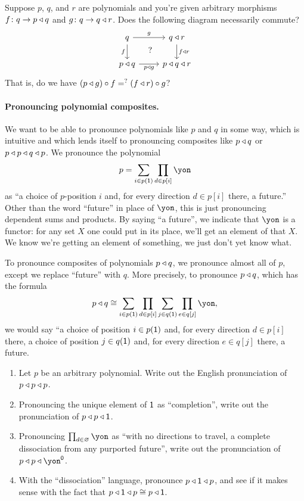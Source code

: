 \documentclass[Book-Poly]{subfiles}
\begin{document}
\begin{exercise}
Suppose $p$, $q$, and $r$ are polynomials and you're given arbitrary morphisms $f\colon q\to p\mathbin{\triangleleft} q$ and $g\colon q\to q\mathbin{\triangleleft} r$. Does the following diagram necessarily commute?
\[
\begin{tikzcd}
	q\ar[r, "g"]\ar[d, "f"']&
	q\tri r\ar[d, "f\tri r"]\\
	p\tri q\ar[r, "p\tri g"']&
	p\tri q\tri r\ar[ul, phantom, "?"]
\end{tikzcd}
\]
That is, do we have $(p\mathbin{\triangleleft} g)\circ f=^?(f\mathbin{\triangleleft} r)\circ g$?
\end{exercise}

\paragraph{Pronouncing polynomial composites.}

We want to be able to pronounce polynomials like $p$ and $q$ in some way, which is intuitive and which lends itself to pronouncing composites like $p\mathbin{\triangleleft} q$ or $p\mathbin{\triangleleft} p\mathbin{\triangleleft} q\mathbin{\triangleleft} p$. We pronounce the polynomial
\[p=\sum_{i\in p(\1)}\prod_{d\in p[i]}\yon\]
as ``a choice of $p$-position $i$ and, for every direction $d\in p[i]$ there, a future.'' Other than the word ``future'' in place of $\yon$, this is just pronouncing dependent sums and products. By saying ``a future'', we indicate that $\yon$ is a functor: for any set $X$ one could put in its place, we'll get an element of that $X$. We know we're getting an element of something, we just don't yet know what.

To pronounce composites of polynomials $p\mathbin{\triangleleft} q$, we pronounce almost all of $p$, except we replace ``future'' with $q$. More precisely, to pronounce $p\mathbin{\triangleleft} q$, which has the formula
\[p\tri q\cong\sum_{i\in p(\1)}\prod_{d\in p[i]}\sum_{j\in q(\1)}\prod_{e\in q[j]}\yon,
\]
we would say ``a choice of position $i\in p(\textsf{1})$ and, for every direction $d\in p[i]$ there, a choice of position $j\in q(\textsf{1})$ and, for every direction $e\in q[j]$ there, a future.

\begin{exercise}
\begin{enumerate}
	\item Let $p$ be an arbitrary polynomial. Write out the English pronunciation of $p\mathbin{\triangleleft} p\mathbin{\triangleleft} p$.
	\item Pronouncing the unique element of $\textsf{1}$ as ``completion'', write out the pronunciation of $p\mathbin{\triangleleft} p\mathbin{\triangleleft} \textsf{1}$.
	\item Pronouncing $\prod_{d\in\varnothing}\yon$ as ``with no directions to travel, a complete dissociation from any purported future'', write out the pronunciation of $p\tri p\tri\yon^\0$.
	\item With the ``dissociation'' language, pronounce $p\mathbin{\triangleleft}\textsf{1}\mathbin{\triangleleft} p$, and see if it makes sense with the fact that $p\mathbin{\triangleleft}\textsf{1}\mathbin{\triangleleft} p\cong p\mathbin{\triangleleft} \textsf{1}$.
\qedhere
\end{enumerate}
\end{exercise}
\end{document}
